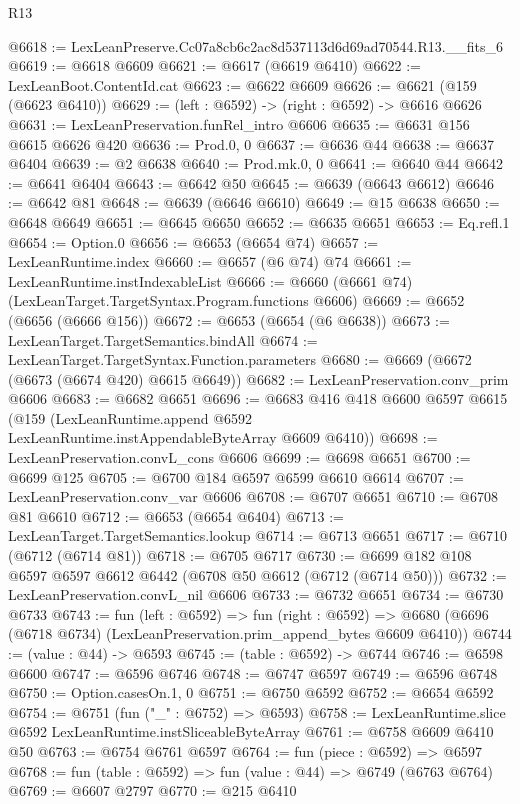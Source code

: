 \begin{lexlean}{R13}
\begin{coremodule}
@6618 := LexLeanPreserve.Cc07a8cb6c2ac8d537113d6d69ad70544.R13.__fits_6
@6619 := @6618 @6609
@6621 := @6617 (@6619 @6410)
@6622 := LexLeanBoot.ContentId.cat
@6623 := @6622 @6609
@6626 := @6621 (@159 (@6623 @6410))
@6629 := (left : @6592) -> (right : @6592) -> @6616 @6626
@6631 := LexLeanPreservation.funRel_intro @6606
@6635 := @6631 @156 @6615 @6626 @420
@6636 := Prod.{0, 0}
@6637 := @6636 @44
@6638 := @6637 @6404
@6639 := @2 @6638
@6640 := Prod.mk.{0, 0}
@6641 := @6640 @44
@6642 := @6641 @6404
@6643 := @6642 @50
@6645 := @6639 (@6643 @6612)
@6646 := @6642 @81
@6648 := @6639 (@6646 @6610)
@6649 := @15 @6638
@6650 := @6648 @6649
@6651 := @6645 @6650
@6652 := @6635 @6651
@6653 := Eq.refl.{1}
@6654 := Option.{0}
@6656 := @6653 (@6654 @74)
@6657 := LexLeanRuntime.index
@6660 := @6657 (@6 @74) @74
@6661 := LexLeanRuntime.instIndexableList
@6666 := @6660 (@6661 @74) (LexLeanTarget.TargetSyntax.Program.functions @6606)
@6669 := @6652 (@6656 (@6666 @156))
@6672 := @6653 (@6654 (@6 @6638))
@6673 := LexLeanTarget.TargetSemantics.bindAll
@6674 := LexLeanTarget.TargetSyntax.Function.parameters
@6680 := @6669 (@6672 (@6673 (@6674 @420) @6615 @6649))
@6682 := LexLeanPreservation.conv_prim @6606
@6683 := @6682 @6651
@6696 := @6683
    @416
    @418
    @6600
    @6597
    @6615
    (@159 (LexLeanRuntime.append @6592 LexLeanRuntime.instAppendableByteArray @6609 @6410))
@6698 := LexLeanPreservation.convL_cons @6606
@6699 := @6698 @6651
@6700 := @6699 @125
@6705 := @6700 @184 @6597 @6599 @6610 @6614
@6707 := LexLeanPreservation.conv_var @6606
@6708 := @6707 @6651
@6710 := @6708 @81 @6610
@6712 := @6653 (@6654 @6404)
@6713 := LexLeanTarget.TargetSemantics.lookup
@6714 := @6713 @6651
@6717 := @6710 (@6712 (@6714 @81))
@6718 := @6705 @6717
@6730 := @6699 @182 @108 @6597 @6597 @6612 @6442 (@6708 @50 @6612 (@6712 (@6714 @50)))
@6732 := LexLeanPreservation.convL_nil @6606
@6733 := @6732 @6651
@6734 := @6730 @6733
@6743 := fun (left : @6592) =>
  fun (right : @6592) =>
  @6680 (@6696 (@6718 @6734) (LexLeanPreservation.prim_append_bytes @6609 @6410))
@6744 := (value : @44) -> @6593
@6745 := (table : @6592) -> @6744
@6746 := @6598 @6600
@6747 := @6596 @6746
@6748 := @6747 @6597
@6749 := @6596 @6748
@6750 := Option.casesOn.{1, 0}
@6751 := @6750 @6592
@6752 := @6654 @6592
@6754 := @6751 (fun ("_" : @6752) => @6593)
@6758 := LexLeanRuntime.slice @6592 LexLeanRuntime.instSliceableByteArray
@6761 := @6758 @6609 @6410 @50
@6763 := @6754 @6761 @6597
@6764 := fun (piece : @6592) => @6597
@6768 := fun (table : @6592) => fun (value : @44) => @6749 (@6763 @6764)
@6769 := @6607 @2797
@6770 := @215 @6410

\end{coremodule}
\end{lexlean}
